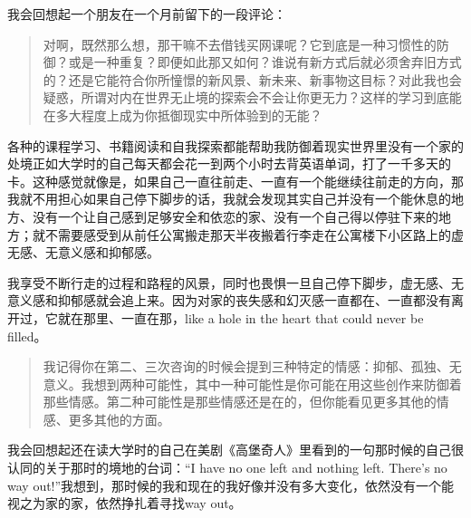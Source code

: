 我会回想起一个朋友在一个月前留下的一段评论：

\blockquote{%
	对啊，既然那么想，那干嘛不去借钱买网课呢？它到底是一种习惯性的防御？或是一种重复？即便如此那又如何？谁说有新方式后就必须舍弃旧方式的？还是它能符合你所憧憬的新风景、新未来、新事物这目标？对此我也会疑惑，所谓对内在世界无止境的探索会不会让你更无力？这样的学习到底能在多大程度上成为你抵御现实中所体验到的无能？
}

各种的课程学习、书籍阅读和自我探索都能帮助我防御着现实世界里没有一个家的处境\pozhehao{}正如大学时的自己每天都会花一到两个小时去背英语单词，打了一千多天的卡。这种感觉就像是，如果自己一直往前走、一直有一个能继续往前走的方向，那我就不用担心如果自己停下脚步的话，我就会发现其实自己并没有一个能休息的地方、没有一个让自己感到足够安全和依恋的家、没有一个自己得以停驻下来的地方；就不需要感受到从前任公寓搬走那天半夜搬着行李走在公寓楼下小区路上的虚无感、无意义感和抑郁感。

我享受不断行走的过程和路程的风景，同时也畏惧一旦自己停下脚步，虚无感、无意义感和抑郁感就会追上来。因为对家的丧失感和幻灭感一直都在、一直都没有离开过，它就在那里、一直在那，like a hole in the heart that could never be filled。

\blockquote{%
	我记得你在第二、三次咨询的时候会提到三种特定的情感：抑郁、孤独、无意义。我想到两种可能性，其中一种可能性是你可能在用这些创作来防御着那些情感。第二种可能性是那些情感还是在的，但你能看见更多其他的情感、更多其他的方面。

}

我会回想起还在读大学时的自己在美剧《高堡奇人》里看到的一句那时候的自己很认同的关于那时的境地的台词：“I have no one left and nothing left. There's no way out!”我想到，那时候的我和现在的我好像并没有多大变化，依然没有一个能视之为家的家，依然挣扎着寻找way out。


